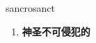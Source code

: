 
\begin{frame}
{\huge sancrosanct}
\begin{center}
\begin{enumerate}\Large
  \item \textbf{神圣不可侵犯的}
\end{enumerate}
\end{center}
\end{frame}
